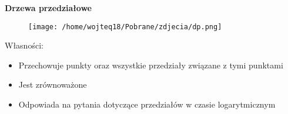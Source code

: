 \documentclass{article}
\begin{document}
    \vspace{1\baselineskip}
    \textbf{Drzewa przedziałowe} \par

    \begin{figure}[H]
        \centering
        \texttt{[image: /home/wojteq18/Pobrane/zdjecia/dp.png]}
        \label{fig:example_image}
    \end{figure} \par

    Własności: \par
    \begin{itemize}
        \item Przechowuje punkty oraz wszystkie przedziały związane z tymi punktami
        \item Jest zrównoważone
        \item Odpowiada na pytania dotyczące przedziałów w czasie logarytmicznym
    \end{itemize}
\end{document}
